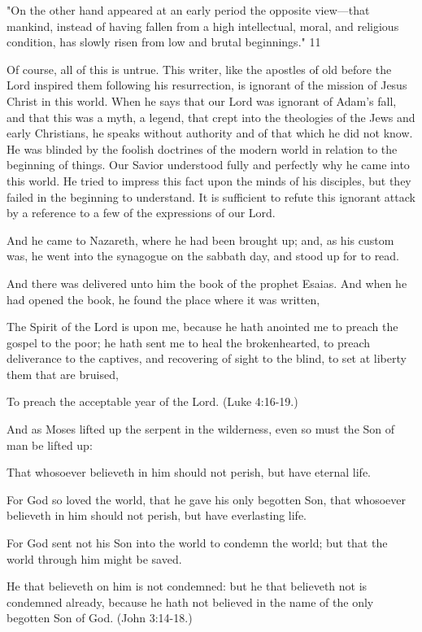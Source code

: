 "On the other hand appeared at an early period the opposite view—that mankind, instead of
having fallen from a high intellectual, moral, and religious condition, has slowly risen from
low and brutal beginnings." 11

Of course, all of this is untrue. This writer, like the apostles of old before the Lord inspired
them following his resurrection, is ignorant of the mission of Jesus Christ in this world.
When he says that our Lord was ignorant of Adam's fall, and that this was a myth, a legend,
that crept into the theologies of the Jews and early Christians, he speaks without authority
and of that which he did not know. He was blinded by the foolish doctrines of the modern
world in relation to the beginning of things. Our Savior understood fully and perfectly why
he came into this world. He tried to impress this fact upon the minds of his disciples, but they
failed in the beginning to understand. It is sufficient to refute this ignorant attack by a
reference to a few of the expressions of our Lord.

And he came to Nazareth, where he had been brought up; and, as his custom was, he went
into the synagogue on the sabbath day, and stood up for to read.

And there was delivered unto him the book of the prophet Esaias. And when he had opened
the book, he found the place where it was written,

The Spirit of the Lord is upon me, because he hath anointed me to preach the gospel to the
poor; he hath sent me to heal the brokenhearted, to preach deliverance to the captives, and
recovering of sight to the blind, to set at liberty them that are bruised,

To preach the acceptable year of the Lord. (Luke 4:16-19.)

And as Moses lifted up the serpent in the wilderness, even so must the Son of man be lifted
up:

That whosoever believeth in him should not perish, but have eternal life.

For God so loved the world, that he gave his only begotten Son, that whosoever believeth in
him should not perish, but have everlasting life.

For God sent not his Son into the world to condemn the world; but that the world through
him might be saved.

He that believeth on him is not condemned: but he that believeth not is condemned already,
because he hath not believed in the name of the only begotten Son of God. (John 3:14-18.)

